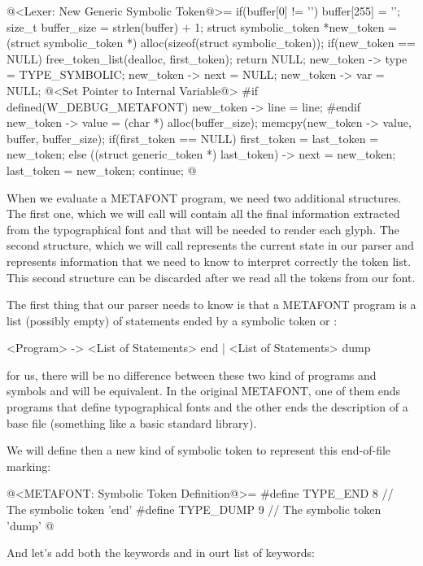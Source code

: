\iniciocodigo
@<Lexer: New Generic Symbolic Token@>=
if(buffer[0] != '\0'){
  buffer[255] = '\0';
  size_t buffer_size = strlen(buffer) + 1;
  struct symbolic_token *new_token =
     (struct symbolic_token *) alloc(sizeof(struct symbolic_token));
  if(new_token == NULL){
    free_token_list(dealloc, first_token);
    return NULL;
  }
  new_token -> type = TYPE_SYMBOLIC;
  new_token -> next = NULL;
  new_token -> var = NULL;
  @<Set Pointer to Internal Variable@>
#if defined(W_DEBUG_METAFONT)
  new_token -> line = line;
#endif
  new_token -> value = (char *) alloc(buffer_size);
  memcpy(new_token -> value, buffer, buffer_size);
  if(first_token == NULL)
    first_token = last_token = new_token;
  else{
    ((struct generic_token *) last_token) -> next = new_token;
    last_token = new_token;
  }
  continue;
}
@
\fimcodigo


When we evaluate a METAFONT program, we need two additional
structures. The first one, which we will call  will contain all the final information extracted from the
typographical font and that will be needed to render each glyph. The
second structure, which we will call 
represents the current state in our parser and represents information
that we need to know to interpret correctly the token list. This
second structure can be discarded after we read all the tokens from
our font.

The first thing that our parser needs to know is that a METAFONT
program is a list (possibly empty) of statements ended by a symbolic
token  or :

\alinhaverbatim
<Program> -> <List of Statements> end | <List of Statements> dump
\alinhanormal

for us, there will be no difference between these two kind of programs
and symbols  and  will be
equivalent. In the original METAFONT, one of them ends programs that
define typographical fonts and the other ends the description of a
base file (something like a basic standard library).

We will define then a new kind of symbolic token to represent this
end-of-file marking:

\iniciocodigo
@<METAFONT: Symbolic Token Definition@>=
#define TYPE_END             8 // The symbolic token 'end'
#define TYPE_DUMP            9 // The symbolic token 'dump'
@
\fimcodigo

And let's add both the keywords  and 
in ourt list of keywords:

